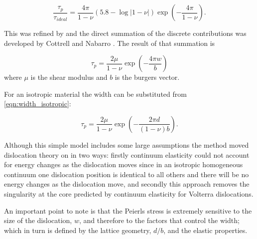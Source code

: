 \begin{equation}
\frac{\tau_p}{\tau_{ideal}} = \frac{4 \pi}{1 - \nu} (5.8 - \log|1-\nu|) \exp\left(-\frac{4\pi}{1 - \nu}\right).
\end{equation}

This was refined by \citet{Nabarro1947} and the direct summation of the discrete contributions was developed by Cottrell and Nabarro \cite{cottrell1953}. The result of that summation is



\begin{equation}
\tau_p = \frac{2\mu}{1-\nu} \exp\left( - \frac{4\pi w}{b} \right)
\end{equation}
where $\mu$ is the shear modulus and $b$ is the burgers vector.

For an isotropic material the width can be substituted from \autoref{eqn:width_isotropic}:

\begin{equation}
\tau_p = \frac{2\mu}{1-\nu} \exp\left( - \frac{2\pi d}{(1-\nu)b} \right).
\end{equation}

Although this simple model includes some large assumptions the method moved dislocation theory on in two ways: firstly continuum elasticity could not account for energy changes as the dislocation moves since in an isotropic homogeneous continuum one dislocation position is identical to all others and there will be no energy changes as the dislocation move, and secondly this approach removes the singularity at the core predicted by continuum elasticity for Volterra dislocations.


An important point to note is that the Peierls stress is extremely sensitive to the size of the dislocation, $w$, and therefore to the factors that control the width; which in turn is defined by the lattice geometry, $d/b$, and the elastic properties.



